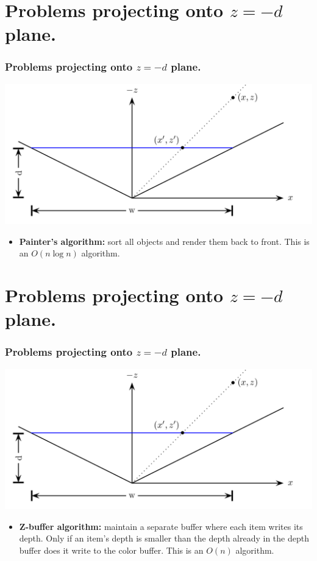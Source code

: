 \documentclass[slidestop,xcolor=pst]{beamer}
\newcommand{\sect}[1]{
\section{#1}
\begin{frame}[fragile]\frametitle{#1}
}
\begin{document}
\sect{Problems projecting onto $z=-d$ plane.}
\includegraphics[width=1\textwidth]{perspective.png}
\begin{itemize}
\item {\bf Painter's algorithm:}  sort all objects and render them
  back to front.  This is an $O(n\log n)$ algorithm.
\end{itemize}
\end{frame}

\sect{Problems projecting onto $z=-d$ plane.}
\includegraphics[width=1\textwidth]{perspective.png}
\begin{itemize}
\item {\bf Z-buffer algorithm:}  maintain a separate buffer where each
  item writes its depth.  Only if an item's depth is smaller than the
  depth already in the depth buffer does it write to the color buffer.
This is an $O(n)$ algorithm.
\end{itemize}
\end{frame}
\end{document}
